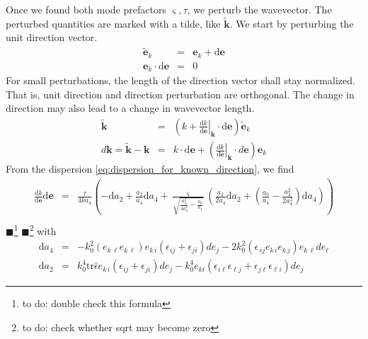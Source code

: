 \documentclass[12pt,a4paper,twoside,openright,BCOR10mm,headsepline,titlepage,abstracton,chapterprefix,final]{scrreprt}
\newcommand\Vector[1]{{\mathbf{#1}}}
\newcommand\wavenumber{k}
\newcommand\Wavevector{\Vector{\wavenumber}}
\newcommand\Tensor[1]{\hat{#1}}
\newcommand\scalarrelativepermittivity{\epsilon}
\newcommand\relativepermittivity{\Tensor{\scalarrelativepermittivity}}
\newcommand{\remark}[1]{{\color{red}$\blacksquare$}\footnote{{\color{red}#1}}}
\renewcommand\d{\textrm{d}}
\begin{document}
Once we found both mode prefactors $\varsigma, \tau$, we perturb the wavevector. 
The perturbed quantities are marked with a tilde, like $\tilde{\Wavevector}$.
We start by perturbing the unit direction vector. 
\begin{eqnarray}
 \tilde{\Vector{e}}_\wavenumber &=& \Vector{e}_\wavenumber + \d\Vector{e} \\
 \Vector{e}_\wavenumber \cdot \d\Vector{e} &=& 0 \label{eq:perturbation_unit_orthogonality}
\end{eqnarray}
For small perturbations, the length of the direction vector shall stay normalized.
That is, unit direction and direction perturbation are orthogonal.
The change in direction may also lead to a change in wavevector length.
\begin{eqnarray}
 \tilde{\Wavevector} &=& 
     \left( 
         \wavenumber + \left. \frac{\d \wavenumber}{\d \Vector{e}}\right|_{\Wavevector} \cdot \d\Vector{e} 
     \right)
     \tilde{\Vector{e}}_\wavenumber 
 \\
 d \Wavevector = \tilde{\Wavevector} - \Wavevector &=& \wavenumber \cdot \d\Vector{e} + \left( \left. \frac{\d \wavenumber}{\d \Vector{e}}\right|_{\Wavevector} \cdot d\Vector{e} \right) \Vector{e}_\wavenumber
\end{eqnarray}
From the dispersion \ref{eq:dispersion_for_known_direction}, we find
\begin{eqnarray}
 \frac{\d \wavenumber}{\d \Vector{e}} \d\Vector{e} &=&
     \frac{\tau}{4 \wavenumber a_4}
     \left(
         - \d a_2 + \frac{a_2}{a_4} \d a_4 
         +  \frac{\varsigma}{\sqrt{\frac{a_2^2}{4 a_4^2} - \frac{a_0}{a_4}}}
                \left( \frac{a_2}{2 a_4} \d a_2 + \left( \frac{a_0}{a_4} - \frac{a_2^2}{2 a_4^2} \right) \d a_4 \right)
     \right)
 \nonumber\\
\end{eqnarray}
\remark{to do: double check this formula}
\remark{to do: check whether sqrt may become zero}
with
\begin{eqnarray}
 \d a_4 &=& - k_0^2 (e_{k\,\ell} e_{k\,\ell}) e_{k\,i} ( \scalarrelativepermittivity_{ij} + \scalarrelativepermittivity_{ji} ) de_{j} - 2 k_0^2 (\scalarrelativepermittivity_{\,ij} e_{k\,i} e_{k\,j}) e_{k\,\ell} de_\ell\\
 \d a_2 &=&    k_0^4 \text{tr} \relativepermittivity e_{k\,i} ( \scalarrelativepermittivity_{ij} + \scalarrelativepermittivity_{ji} ) de_{j} - k_0^4 e_{ki} ( \scalarrelativepermittivity_{i\ell} \scalarrelativepermittivity_{\ell j} + \scalarrelativepermittivity_{j\ell} \scalarrelativepermittivity_{\ell i} ) de_{j}
\end{eqnarray}
\end{document}
